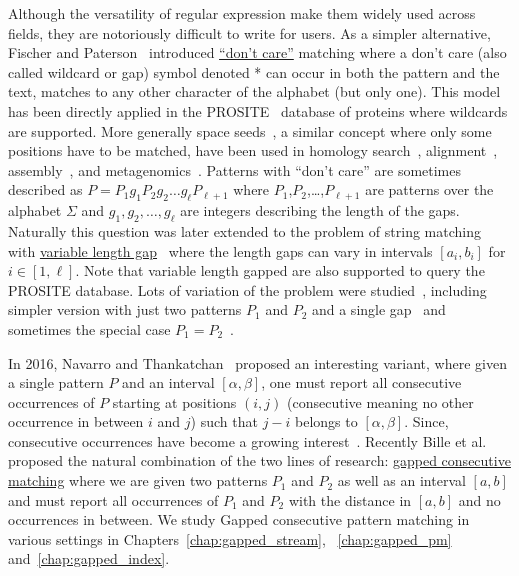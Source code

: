 Although the versatility of regular expression make them widely used across fields, they are notoriously difficult to write for users.
As a simpler alternative, Fischer and Paterson~\cite{fischer1974string} introduced \underline{``don't care''} matching where a don't care (also called wildcard or gap) symbol denoted * can occur in both the pattern and the text, matches to any other character of the alphabet (but only one).
This model has been directly applied in the PROSITE~\cite{hulo2006prosite} database of proteins where wildcards are supported. More generally space seeds~\cite{li2004patternhunter}, a similar concept where only some positions have to be matched, have been used in homology search~\cite{ma2002patternhunter}, alignment~\cite{david2011shrimp2}, assembly~\cite{birol2015spaced}, and metagenomics~\cite{bvrinda2015spaced}.
Patterns with ``don't care'' are sometimes~\cite{lewenstein2011indexing} described as $P= P_1g_1P_2g_2 \dots g_\ell P_{\ell+1}$ where $P_1$,$P_2$,\dots,$P_{\ell+1}$ are patterns over the alphabet $\Sigma$ and $g_1,g_2,\dots,g_{\ell}$ are integers describing the length of the gaps. 
Naturally this question was later extended to the problem of string matching with \underline{variable length gap}~\cite{bille2012string,bille2014string} where the length gaps can vary in intervals $[a_i,b_i]$ for $i\in[1,\ell]$.
Note that variable length gapped are also supported to query the PROSITE database.
Lots of variation of the problem were studied~\cite{kopelowitz2016color,cohen2009range,brodal1999finding}, including simpler version with just two patterns $P_1$ and $P_2$ and a single gap~\cite{peterlongo2006gapped,iliopoulos2009indexing} and sometimes the special case $P_1=P_2$~\cite{muthukrishnan2002efficient,keller2007range}.

In 2016, Navarro and Thankatchan~\cite{NAVARRO2016108} proposed an interesting variant, where given a single pattern $P$ and an interval $[\alpha,\beta]$, one must report all consecutive occurrences of $P$ starting at positions $(i,j)$ (consecutive meaning no other occurrence in between $i$ and $j$) such that $j-i$ belongs to $[\alpha,\beta]$. Since, consecutive occurrences have become a growing interest~\cite{DBLP:conf/fsttcs/BilleGPRS20,cpm/BilleGPS21,DBLP:journals/corr/abs-2304-00887,DBLP:journals/corr/abs-2211-16860}.
Recently Bille et al.~\cite{bille2022gapped} proposed the natural combination of the two lines of research: \underline{gapped consecutive matching} where we are given two patterns $P_1$ and $P_2$ as well as an interval $[a,b]$ and must report all occurrences of $P_1$ and $P_2$ with the distance in $[a,b]$ and no occurrences in between.
We study Gapped consecutive pattern matching in various settings in Chapters~\ref{chap:gapped_stream}, ~\ref{chap:gapped_pm} and~\ref{chap:gapped_index}.


